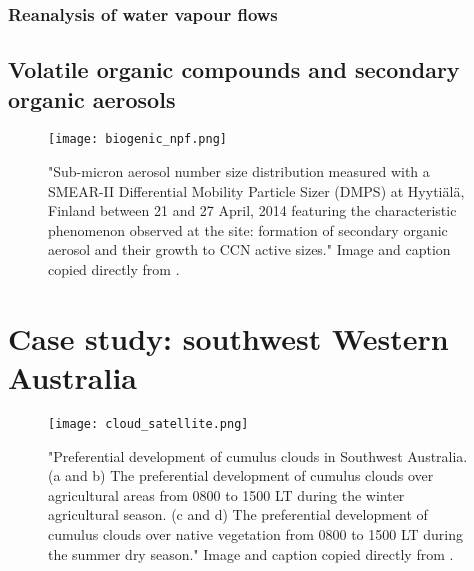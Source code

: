 \subsubsection{Reanalysis of water vapour flows}

\subsection{Volatile organic compounds and secondary organic aerosols}

\begin{figure}[!ht]
	\centering
	\texttt{[image: biogenic\_npf.png]}
	\caption[Secondary organic aerosols growing into CCN active sizes]{"Sub-micron aerosol number size distribution measured with a SMEAR-II Differential Mobility Particle Sizer (DMPS) at Hyytiälä, Finland between 21 and 27 April, 2014 featuring the characteristic phenomenon observed at the site: formation of secondary organic aerosol and their growth to CCN active sizes." Image and caption copied directly from \citet{petaja2016}.}
	\label{fig:biogenic_npf}
\end{figure}

\section{Case study: southwest Western Australia}

\begin{figure}[!ht]
	\centering
	\texttt{[image: cloud\_satellite.png]}
	\caption[Satellite image of delineated cumulus development along fence]{"Preferential development of cumulus clouds in Southwest Australia. (a and b) The preferential development of cumulus clouds over agricultural areas from 0800 to 1500 LT during the winter agricultural season. (c and d) The preferential development of cumulus clouds over native vegetation from 0800 to 1500 LT during the summer dry season." Image and caption copied directly from \citet{ray2003}.}
	\label{fig:cloud_satellite}
\end{figure}